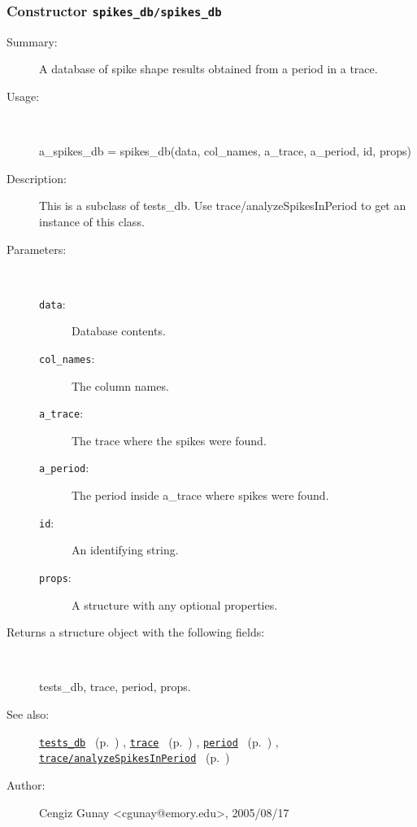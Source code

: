\subsubsection[Constructor \texttt{spikes\_db}]{Constructor \texttt{spikes\_db/spikes\_db}}%
%
\label{ref_spikes_db__spikes_db}%
\hypertarget{ref_spikes_db__spikes_db}{}%
\begin{description}
\item[Summary:]A database of spike shape results obtained from a period in a trace.
%
\item[Usage:]~%
\begin{lyxcode}%
a\_spikes\_db = spikes\_db(data, col\_names, a\_trace, a\_period, id, props)
%
\end{lyxcode}%
%
\item[Description:]%
This is a subclass of tests\_db. Use trace/analyzeSpikesInPeriod to 
 get an instance of this class.
\item[Parameters:]~
\begin{description}%
\item[\texttt{data}:]
 Database contents.
\item[\texttt{col\_names}:]
 The column names.
\item[\texttt{a\_trace}:]
 The trace where the spikes were found.
\item[\texttt{a\_period}:]
 The period inside a\_trace where spikes were found.
\item[\texttt{id}:]
 An identifying string.
\item[\texttt{props}:]
 A structure with any optional properties.
\end{description}%
%
\item[Returns a structure object with the following fields:
]~

	tests\_db, trace, period, props.
%
%
\item[See also:]%
\hyperlink{ref_tests_db}{\texttt{tests\_db}}%
\ (p.~\pageref{ref_tests_db})%
%
, \hyperlink{ref_trace}{\texttt{trace}}%
\ (p.~\pageref{ref_trace})%
%
, \hyperlink{ref_period}{\texttt{period}}%
\ (p.~\pageref{ref_period})%
%
, \hyperlink{ref_trace__analyzeSpikesInPeriod}{\texttt{trace/analyzeSpikesInPeriod}}%
\ (p.~\pageref{ref_trace__analyzeSpikesInPeriod})%
%
%
\item[Author:]%
Cengiz Gunay <cgunay@emory.edu>, 2005/08/17
%
\end{description}
\methodline%
